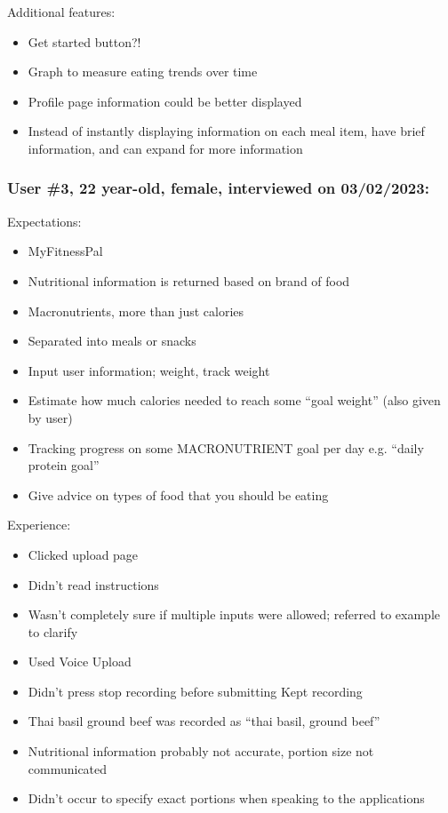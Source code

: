 \documentclass[12pt, titlepage]{article}
\begin{document}
	Additional features:
	\begin{itemize}
		\item Get started button?!
		\item Graph to measure eating trends over time
		\item Profile page information could be better displayed
		\item Instead of instantly displaying information on each meal item, have brief information, and can expand for more information
	\end{itemize}

	\subsubsection*{User \#3, 22 year-old, female, interviewed on 03/02/2023:}
	Expectations:
	\begin{itemize}
		\item MyFitnessPal
		\item Nutritional information is returned based on brand of food
		\item Macronutrients, more than just calories
		\item Separated into meals or snacks
		\item Input user information; weight, track weight
		\item Estimate how much calories needed to reach some “goal weight” (also given by
		user)
		\item Tracking progress on some MACRONUTRIENT goal per day e.g. “daily protein
		goal”
		\item Give advice on types of food that you should be eating
	\end{itemize}
	Experience:
	\begin{itemize}
		\item Clicked upload page
		\item Didn’t read instructions
		\item Wasn’t completely sure if multiple inputs were allowed; referred to example to clarify
		\item Used Voice Upload
		\item Didn’t press stop recording before submitting
		\subitem Kept recording
		\item Thai basil ground beef was recorded as “thai basil, ground beef”
		\item Nutritional information probably not accurate, portion size not communicated
		\item Didn’t occur to specify exact portions when speaking to the applications
	\end{itemize}
\end{document}
